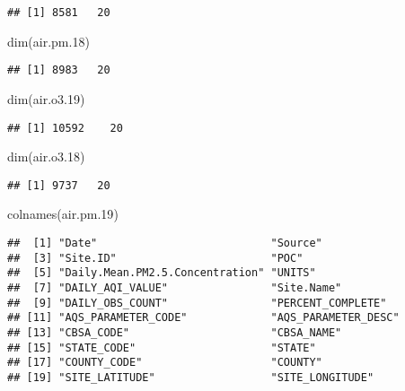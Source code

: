 \documentclass[
]{article}
\newenvironment{Shaded}{\begin{snugshade}}{\end{snugshade}}
\newcommand{\FloatTok}[1]{\textcolor[rgb]{0.00,0.00,0.81}{#1}}
\newcommand{\FunctionTok}[1]{\textcolor[rgb]{0.00,0.00,0.00}{#1}}
\newcommand{\NormalTok}[1]{#1}
\begin{document}
\begin{verbatim}
## [1] 8581   20
\end{verbatim}

\begin{Shaded}
\begin{Highlighting}[]
\FunctionTok{dim}\NormalTok{(air.pm}\FloatTok{.18}\NormalTok{)}
\end{Highlighting}
\end{Shaded}

\begin{verbatim}
## [1] 8983   20
\end{verbatim}

\begin{Shaded}
\begin{Highlighting}[]
\FunctionTok{dim}\NormalTok{(air.o3}\FloatTok{.19}\NormalTok{)}
\end{Highlighting}
\end{Shaded}

\begin{verbatim}
## [1] 10592    20
\end{verbatim}

\begin{Shaded}
\begin{Highlighting}[]
\FunctionTok{dim}\NormalTok{(air.o3}\FloatTok{.18}\NormalTok{)}
\end{Highlighting}
\end{Shaded}

\begin{verbatim}
## [1] 9737   20
\end{verbatim}

\begin{Shaded}
\begin{Highlighting}[]
\FunctionTok{colnames}\NormalTok{(air.pm}\FloatTok{.19}\NormalTok{)}
\end{Highlighting}
\end{Shaded}

\begin{verbatim}
##  [1] "Date"                           "Source"                        
##  [3] "Site.ID"                        "POC"                           
##  [5] "Daily.Mean.PM2.5.Concentration" "UNITS"                         
##  [7] "DAILY_AQI_VALUE"                "Site.Name"                     
##  [9] "DAILY_OBS_COUNT"                "PERCENT_COMPLETE"              
## [11] "AQS_PARAMETER_CODE"             "AQS_PARAMETER_DESC"            
## [13] "CBSA_CODE"                      "CBSA_NAME"                     
## [15] "STATE_CODE"                     "STATE"                         
## [17] "COUNTY_CODE"                    "COUNTY"                        
## [19] "SITE_LATITUDE"                  "SITE_LONGITUDE"
\end{verbatim}
\end{document}

